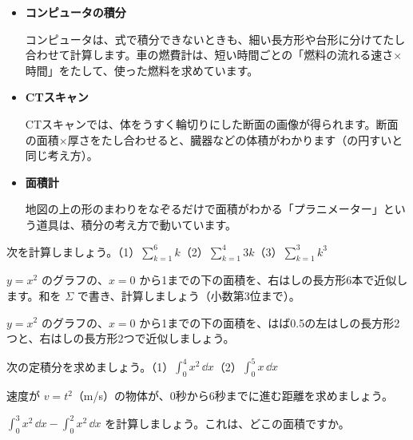 \begin{butsuri}
\begin{itemize}[leftmargin=1.2\zw, itemsep=2pt, topsep=0pt, label={\color{bkPurple}●}]
\item \textbf{コンピュータの積分}\par
コンピュータは、式で積分できないときも、細い長方形や台形に分けてたし合わせて計算します。車の燃費計は、短い時間ごとの「燃料の流れる速さ×時間」をたして、使った燃料を求めています。
\item \textbf{CTスキャン}\par
CTスキャンでは、体をうすく輪切りにした断面の画像が得られます。断面の面積×厚さをたし合わせると、臓器などの体積がわかります（の円すいと同じ考え方）。
\item \textbf{面積計}\par
地図の上の形のまわりをなぞるだけで面積がわかる「プラニメーター」という道具は、積分の考え方で動いています。
\end{itemize}
\end{butsuri}


\bkendproblems
{}

\bkproblem 次を計算しましょう。\quad（1）$\displaystyle\sum_{k=1}^{6}k$\quad（2）$\displaystyle\sum_{k=1}^{4}3k$\quad（3）$\displaystyle\sum_{k=1}^{3}k^3$

\bkproblem $y=x^2$ のグラフの、$x=0$ から1までの下の面積を、右はしの長方形6本で近似します。和を $\Sigma$ で書き、計算しましょう（小数第3位まで）。

\bkproblem $y=x^2$ のグラフの、$x=0$ から1までの下の面積を、はば0.5の左はしの長方形2つと、右はしの長方形2つで近似しましょう。

\bkproblem 次の定積分を求めましょう。\quad（1）$\displaystyle\int_0^4x^2\,\dd x$\quad（2）$\displaystyle\int_0^5 x\,\dd x$

\bkproblem 速度が $v=t^2$（m/s）の物体が、0秒から6秒までに進む距離を求めましょう。

\bkproblem $\displaystyle\int_0^3x^2\,\dd x-\int_0^2x^2\,\dd x$ を計算しましょう。これは、どこの面積ですか。

